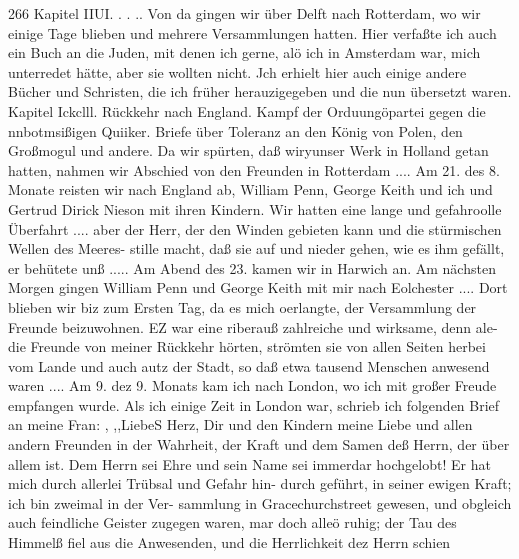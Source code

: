 266 Kapitel IIUI.
. . .. Von da gingen wir über Delft nach Rotterdam, wo wir
einige Tage blieben und mehrere Versammlungen hatten. Hier
verfaßte ich auch ein Buch an die Juden, mit denen ich gerne,
alö ich in Amsterdam war, mich unterredet hätte, aber sie wollten
nicht. Jch erhielt hier auch einige andere Bücher und Schristen,
die ich früher herauzigegeben und die nun übersetzt waren.
Kapitel Ickclll.
Rückkehr nach England. Kampf der Orduungöpartei gegen die
nnbotmsißigen Quiiker. Briefe über Toleranz an den König von
Polen, den Großmogul und andere.
Da wir spürten, daß wiryunser Werk in Holland getan
hatten, nahmen wir Abschied von den Freunden in Rotterdam ....
Am 21. des 8. Monate reisten wir nach England ab, William
Penn, George Keith und ich und Gertrud Dirick Nieson mit ihren
Kindern. Wir hatten eine lange und gefahroolle Überfahrt ....
aber der Herr, der den Winden gebieten kann und die stürmischen
Wellen des Meeres- stille macht, daß sie auf und nieder gehen,
wie es ihm gefällt, er behütete unß ..... Am Abend des 23.
kamen wir in Harwich an. Am nächsten Morgen gingen William
Penn und George Keith mit mir nach Eolchester .... Dort blieben
wir biz zum Ersten Tag, da es mich oerlangte, der Versammlung
der Freunde beizuwohnen. EZ war eine riberauß zahlreiche und
wirksame, denn ale- die Freunde von meiner Rückkehr hörten,
strömten sie von allen Seiten herbei vom Lande und auch autz
der Stadt, so daß etwa tausend Menschen anwesend waren ....
Am 9. dez 9. Monats kam ich nach London, wo ich mit großer
Freude empfangen wurde.
Als ich einige Zeit in London war, schrieb ich folgenden Brief
an meine Fran: ,
,,LiebeS Herz,
Dir und den Kindern meine Liebe und allen andern Freunden
in der Wahrheit, der Kraft und dem Samen deß Herrn, der über
allem ist. Dem Herrn sei Ehre und sein Name sei immerdar
hochgelobt! Er hat mich durch allerlei Trübsal und Gefahr hin-
durch geführt, in seiner ewigen Kraft; ich bin zweimal in der Ver-
sammlung in Gracechurchstreet gewesen, und obgleich auch feindliche
Geister zugegen waren, mar doch alleö ruhig; der Tau des Himmelß
fiel aus die Anwesenden, und die Herrlichkeit dez Herrn schien


